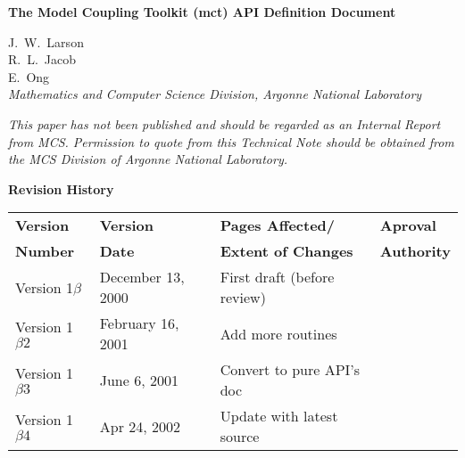 \documentclass{article}
\begin{document}
\begin{sloppypar}
{\huge\bf
The Model Coupling Toolkit (mct) API Definition Document
\\ }                     %
\end{sloppypar}

\vspace{.3in}
             J.~W.~Larson\\
             R.~L.~Jacob\\
             E.~Ong\\
\vspace{.2in} {\em Mathematics and Computer Science Division,
Argonne National Laboratory\\}

\vfill

{\em This paper has not been published and should  be regarded as
an Internal Report from MCS. Permission to quote from this
Technical Note should be  obtained from the MCS Division of
Argonne National Laboratory.}

\vspace{0.4in}


\thispagestyle{empty}
\newpage




\newpage
\setcounter{page}{2}     %


\vspace*{\fill}

\centerline{\huge\bf Revision History}

\bigskip
{}

\begin{center}
\begin{tabular}{|l|l|l|l|}\hline
{\bf Version} & {\bf Version} & {\bf Pages Affected/}   & {\bf Aproval}\\
{\bf Number}  & {\bf Date}    & {\bf Extent of Changes} & {\bf Authority}\\
\hline
\hline 
Version 1$\beta$ & December 13, 2000      & First draft (before review) &
\\\hline
Version 1$\beta2$ & February 16, 2001      & Add more routines &
\\\hline
Version 1$\beta3$ & June 6, 2001      & Convert to pure API's doc &
\\\hline
Version 1$\beta4$ & Apr 24, 2002      & Update with latest source &
\\\hline
\end{tabular}
\end{center}
\end{document}
